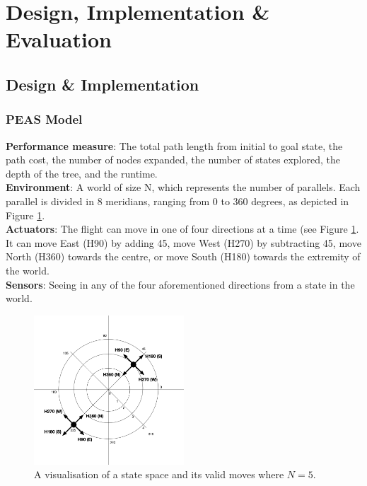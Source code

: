 \documentclass[letterpaper,12pt]{article}
\begin{document}

\newpage
\section{Design, Implementation \& Evaluation}
\label{sec:design-implementation-evaluation}

\subsection{Design \& Implementation}

\subsubsection{PEAS Model}

\textbf{Performance measure}: The total path length from initial to goal state, the path cost, the number of nodes expanded, the number of states explored, the depth of the tree, and the runtime.\\

\textbf{Environment}: A world of size N, which represents the number of parallels. Each parallel is divided in 8 meridians, ranging from 0 to 360 degrees, as depicted in Figure \ref{fig:map}.\\

\textbf{Actuators}: The flight can move in one of four directions at a time (see Figure \ref{fig:map}. It can move East (H90) by adding 45\degree, move West (H270) by subtracting 45\degree, move North (H360) towards the centre, or move South (H180) towards the extremity of the world.\\

\textbf{Sensors}: Seeing in any of the four aforementioned directions from a state in the world.

\begin{figure}[ht]
\centering
\includegraphics[width=0.5\textwidth]{report/figures/map.png}
\caption{\label{fig:map}A visualisation of a state space and its valid moves where $N=5$.}
\end{figure}
\end{document}
